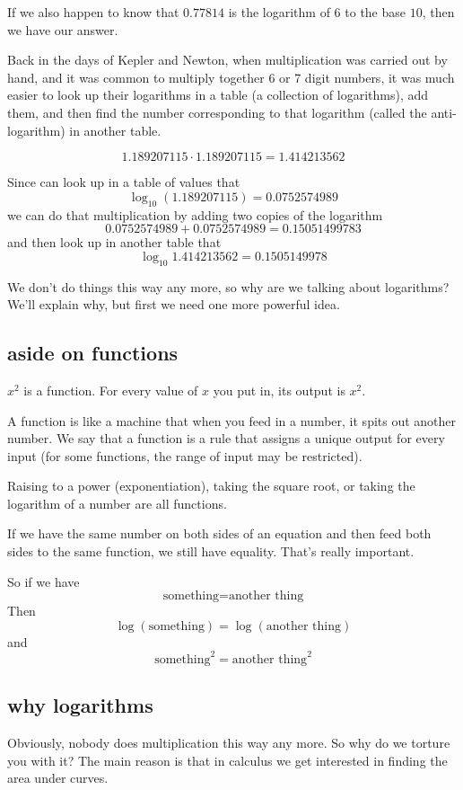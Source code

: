 \documentclass[11pt, oneside]{article}
\begin{document}
If we also happen to know that $0.77814$ is the logarithm of $6$ to the base $10$, then we have our answer.

Back in the days of Kepler and Newton, when multiplication was carried out by hand, and it was common to multiply together 6 or 7 digit numbers, it was much easier to look up their logarithms in a table (a collection of logarithms), add them, and then find the number corresponding to that logarithm (called the anti-logarithm) in another table.

\[ 1.189207115 \cdot 1.189207115 = 1.414213562 \]

Since can look up in a table of values that 
\[ \log_{10} (1.189207115) = 0.0752574989 \] 
we can do that multiplication by adding two copies of the logarithm
\[ 0.0752574989 + 0.0752574989 = 0.15051499783 \]
 and then look up in another table that 
 \[ \log_{10} 1.414213562 = 0.1505149978 \]

We don't do things this way any more, so why are we talking about logarithms?  We'll explain why, but first we need one more powerful idea.

\subsection*{aside on functions}
$x^2$ is a function.  For every value of $x$ you put in, its output is $x^2$.

A function is like a machine that when you feed in a number, it spits out another number.  We say that a function is a rule that assigns a unique output for every input (for some functions, the range of input may be restricted).

Raising to a power (exponentiation), taking the square root, or taking the logarithm of a number are all functions.

If we have the same number on both sides of an equation and then feed both sides to the same function, we still have equality.  That's really important.

So if we have
\[ \text{something} = \text{another thing} \]
Then
\[ \log(\text{something}) = \log(\text{another thing}) \]
and
\[ \text{something}^2 = \text{another thing}^2 \]

\subsection*{why logarithms}

Obviously, nobody does multiplication this way any more. So why do we torture you with it?  The main reason is that in calculus we get interested in finding the area under curves.  
\end{document}

